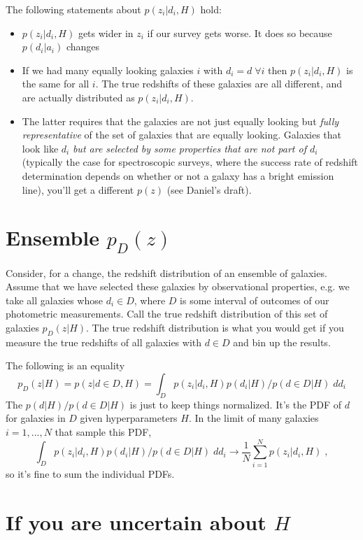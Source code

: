 \documentclass[11pt]{amsart}
\begin{document}
The following statements about $p(z_i|d_i, H)$ hold:
\begin{itemize}
\item $p(z_i|d_i,  H)$ gets wider in $z_i$ if our survey gets worse. It does so because $p(d_i|a_i)$ changes
\item If we had many equally looking galaxies $i$ with $d_i=d \; \forall i$ then $p(z_i|d_i, H)$ is the same for all $i$. The true redshifts of these galaxies are all different, and are actually distributed as $p(z_i|d_i, H)$.
\item The latter requires that the galaxies are not just equally looking but \emph{fully representative} of the set of galaxies that are equally looking. Galaxies that look like $d_i$ \emph{but are selected by some properties that are not part of $d_i$} (typically the case for spectroscopic surveys, where the success rate of redshift determination depends on whether or not a galaxy has a bright emission line), you'll get a different $p(z)$ (see Daniel's draft).
\end{itemize}

\section{Ensemble $p_D(z)$}

Consider, for a change, the redshift distribution of an ensemble of galaxies. Assume that we have selected these galaxies by observational properties, e.g. we take all galaxies whose $d_i\in D$, where $D$ is some interval of outcomes of our photometric measurements. Call the true redshift distribution of this set of galaxies $p_D(z|H)$. The true redshift distribution is what you would get if you measure the true redshifts of all galaxies with $d\in D$ and bin up the results.

The following is an equality
\begin{equation}
p_D(z|H)=p(z|d\in D, H)=\int_{D}p(z_i|d_i, H) p(d_i|H)/p(d\in D|H) \; d d_i 
\end{equation}
The $p(d|H)/p(d\in D|H)$ is just to keep things normalized. It's the PDF of $d$ for galaxies in $D$ given hyperparameters $H$. In the limit of many galaxies $i=1,...,N$ that sample this PDF, 
\begin{equation}
\int_{D}p(z_i|d_i,H) p(d_i|H)/p(d\in D|H) \; d d_i \rightarrow \frac{1}{N} \sum_{i=1}^N p(z_i|d_i,H) \; ,
\end{equation}
so it's fine to sum the individual PDFs.

\section{If you are uncertain about $H$}
\end{document}
